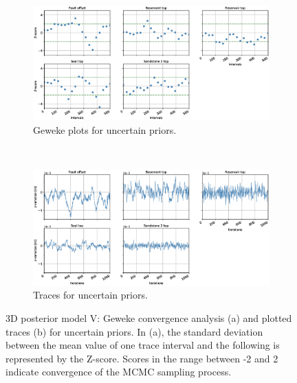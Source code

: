\documentclass[a4paper,11pt]{MScThesis}
\begin{document}
	\begin{figure}[h]
		\begin{subfigure}{1\textwidth}
			\centering
			\includegraphics[width=1\linewidth]{Figures/Appendix/ML5/Geweke_ML5.eps}
			\caption{Geweke plots for uncertain priors.}
		\end{subfigure}%
		\\
		\begin{subfigure}{1\textwidth}
			\centering
			\includegraphics[width=1\linewidth]{Figures/Appendix/ML5/Traces_ML5.eps}
			\caption{Traces for uncertain priors.}
		\end{subfigure}
		\caption{3D posterior model V: Geweke convergence analysis (a) and plotted traces (b) for uncertain priors. In (a), the standard deviation between the mean value of one trace interval and the following is represented by the Z-score. Scores in the range between -2 and 2 indicate convergence of the MCMC sampling process.}
		\label{fig:gew_ML5}
	\end{figure}


    \printindex
    \cleardoublepage
\end{document}
